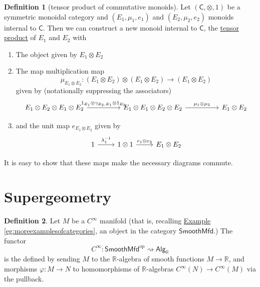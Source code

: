 \documentclass[a4paper]{report}
\newcommand{\R}{\mathbb{R}}
\newcommand{\defn}[1]{\ul{#1}}
\theoremstyle{definition}
\newtheorem{definition}{Definition}[section]
\theoremstyle{plain}
\theoremstyle{remark}
\begin{document}
\begin{definition}[tensor product of commutative monoids]
  \label{def:tensorproductofcommutativemonoids}
  Let $(\mathsf{C}, \otimes, 1)$ be a symmetric monoidal category and $(E_{1}, \mu_{1}, e_{1})$ and $(E_{2}, \mu_{2}, e_{2})$ monoids internal to $\mathsf{C}$. Then we can construct a new monoid internal to $\mathsf{C}$, the \defn{tensor product} of $E_{1}$ and $E_{2}$ with

  \begin{enumerate}
    \item The object given by $E_{1} \otimes E_{2}$

    \item The map multiplication map
      \begin{equation*}
        \mu_{E_{1} \otimes E_{2}}\colon (E_{1} \otimes E_{2}) \otimes (E_{1} \otimes E_{2}) \to (E_{1} \otimes E_{2})
      \end{equation*}
      given by (notationally suppressing the associators)
      \begin{equation*}
        \begin{tikzcd}[column sep=huge]
          E_{1} \otimes E_{2} \otimes E_{1} \otimes E_{2} 
          \arrow[r, "{1_{E_{1}} \otimes \gamma_{E_{2}, E_{1}} \otimes 1_{E_{2}}}"]
          & E_{1} \otimes E_{1} \otimes E_{2} \otimes E_{2}  
          \arrow[r, "\mu_{1} \otimes \mu_{2}"]
          & E_{1} \otimes E_{2}
        \end{tikzcd}
      \end{equation*}

    \item and the unit map $e_{E_{1} \otimes E_{2}}$ given by
      \begin{equation*}
        \begin{tikzcd}
          1
          \arrow[r, "\lambda^{-1}_{1}"]
          & 1 \otimes 1
          \arrow[r, "e_{1} \otimes e_{2}"]
          & E_{1} \otimes E_{2}
        \end{tikzcd}
      \end{equation*}
  \end{enumerate}

  It is easy to show that these maps make the necessary diagrams commute.
\end{definition}


\section{Supergeometry}
\begin{definition}
  \label{def:functorcinfinity}
  Let $M$ be a $C^{\infty}$ manifold (that is, recalling \hyperref[eg:moreexamplesofcategories]{Example \ref*{eg:moreexamplesofcategories}}, an object in the category $\mathsf{SmoothMfd}$.) The functor 
  \begin{equation*}
    C^{\infty}\colon \mathsf{SmoothMfd}^{\mathrm{op}} \rightsquigarrow \mathsf{Alg}_{\R}
  \end{equation*}
  is the defined by sending $M$ to the $\R$-algebra of smooth functions $M \to \R$, and morphisms $\varphi\colon M \to N$ to homomorphisms of $\R$-algebras $C^{\infty}(N) \to C^{\infty}(M)$ via the pullback. 
\end{definition}
\end{document}
